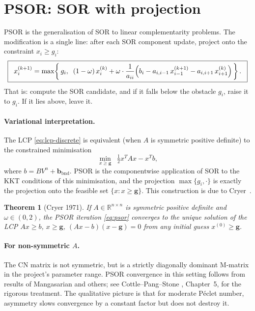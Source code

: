 \documentclass[11pt,a4paper]{article}
\newtheorem{theorem}[proposition]{Theorem}
\begin{document}
\section{PSOR: SOR with projection}

PSOR is the generalisation of SOR to linear complementarity problems.
The modification is a single line: after each SOR component update,
project onto the constraint $x_i \geq g_i$:
\begin{equation}
\boxed{\;\;
x_i^{(k+1)} = \max\!\left\{\,g_i,\;\;
(1 - \omega)\,x_i^{(k)}
+ \omega \cdot \frac{1}{a_{ii}}\Bigl(b_i
- a_{i,i-1}\,x_{i-1}^{(k+1)}
- a_{i,i+1}\,x_{i+1}^{(k)}\Bigr)\,\right\}.
\;\;}
\label{eq:psor}
\end{equation}
That is: compute the SOR candidate, and if it falls below the
obstacle $g_i$, raise it to $g_i$. If it lies above, leave it.

\paragraph{Variational interpretation.} The LCP
\eqref{eq:lcp-discrete} is equivalent (when $A$ is symmetric positive
definite) to the constrained minimisation
\[
\min_{x \geq \mathbf{g}}\;\; \tfrac{1}{2} x^T A x - x^T b,
\]
where $b = B V^n + \mathbf{b}_{\mathrm{bnd}}$. PSOR is the
componentwise application of SOR to the KKT conditions of this
minimisation, and the projection $\max\{g_i, \cdot\}$ is exactly the
projection onto the feasible set $\{x : x \geq \mathbf{g}\}$. This
construction is due to Cryer~\cite{Cryer1971}.

\begin{theorem}[Cryer 1971]
If $A \in \mathbb{R}^{n \times n}$ is symmetric positive definite
and $\omega \in (0, 2)$, the PSOR iteration \eqref{eq:psor} converges
to the unique solution of the LCP $A x \geq b$, $x \geq \mathbf{g}$,
$(Ax - b)(x - \mathbf{g}) = 0$ from any initial guess $x^{(0)} \geq
\mathbf{g}$.
\end{theorem}

\paragraph{For non-symmetric $A$.} The CN matrix is not symmetric,
but is a strictly diagonally dominant M-matrix in the project's
parameter range. PSOR convergence in this setting follows from
results of Mangasarian and others; see Cottle--Pang--Stone
\cite{CPS2009}, Chapter~5, for the rigorous treatment. The
qualitative picture is that for moderate Péclet number, asymmetry
slows convergence by a constant factor but does not destroy it.
\end{document}
